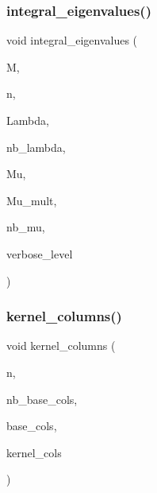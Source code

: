 \subsubsection{\texorpdfstring{integral\+\_\+eigenvalues()}{integral\_eigenvalues()}}
{\footnotesize\ttfamily void integral\+\_\+eigenvalues (\begin{DoxyParamCaption}\item[{\mbox{\hyperlink{galois_8h_a09fddde158a3a20bd2dcadb609de11dc}{I\+NT}} $\ast$}]{M,  }\item[{\mbox{\hyperlink{galois_8h_a09fddde158a3a20bd2dcadb609de11dc}{I\+NT}}}]{n,  }\item[{\mbox{\hyperlink{galois_8h_a09fddde158a3a20bd2dcadb609de11dc}{I\+NT}} $\ast$\&}]{Lambda,  }\item[{\mbox{\hyperlink{galois_8h_a09fddde158a3a20bd2dcadb609de11dc}{I\+NT}} \&}]{nb\+\_\+lambda,  }\item[{\mbox{\hyperlink{galois_8h_a09fddde158a3a20bd2dcadb609de11dc}{I\+NT}} $\ast$\&}]{Mu,  }\item[{\mbox{\hyperlink{galois_8h_a09fddde158a3a20bd2dcadb609de11dc}{I\+NT}} $\ast$\&}]{Mu\+\_\+mult,  }\item[{\mbox{\hyperlink{galois_8h_a09fddde158a3a20bd2dcadb609de11dc}{I\+NT}} \&}]{nb\+\_\+mu,  }\item[{\mbox{\hyperlink{galois_8h_a09fddde158a3a20bd2dcadb609de11dc}{I\+NT}}}]{verbose\+\_\+level }\end{DoxyParamCaption})}

\mbox{\label{burnside_8_c_a7c9047e57c19e74420a813fa46533ec3}} 
\subsubsection{\texorpdfstring{kernel\+\_\+columns()}{kernel\_columns()}}
{\footnotesize\ttfamily void kernel\+\_\+columns (\begin{DoxyParamCaption}\item[{\mbox{\hyperlink{galois_8h_a09fddde158a3a20bd2dcadb609de11dc}{I\+NT}}}]{n,  }\item[{\mbox{\hyperlink{galois_8h_a09fddde158a3a20bd2dcadb609de11dc}{I\+NT}}}]{nb\+\_\+base\+\_\+cols,  }\item[{\mbox{\hyperlink{galois_8h_a09fddde158a3a20bd2dcadb609de11dc}{I\+NT}} $\ast$}]{base\+\_\+cols,  }\item[{\mbox{\hyperlink{galois_8h_a09fddde158a3a20bd2dcadb609de11dc}{I\+NT}} $\ast$}]{kernel\+\_\+cols }\end{DoxyParamCaption})}

